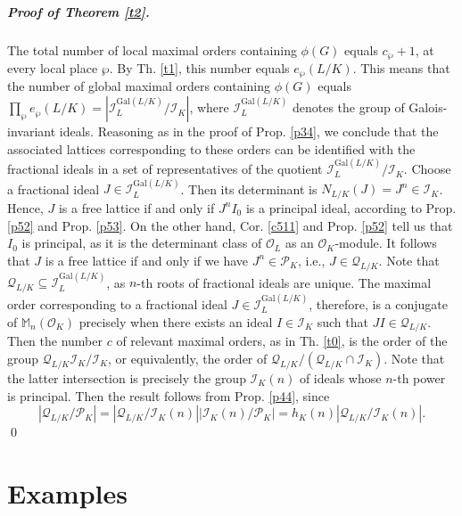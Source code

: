 \documentclass{article}
\theoremstyle{definition}
\begin{document}
\subparagraph{Proof of Theorem \ref{t2}.}
    The total number of local maximal orders containing $\phi(G)$ equals 
    $c_\wp+1$, at every local place $\wp$. By Th. \ref{t1}, 
    this number 
    equals $e_\wp(L/K)$. This means that the number of 
    global maximal orders
    containing $\phi(G)$ equals $\prod_\wp e_\wp(L/K)=
    |\mathcal{I}_L^{\mathrm{Gal}(L/K)}/\mathcal{I}_K|$, where
    $\mathcal{I}_L^{\mathrm{Gal}(L/K)}$ denotes the group of Galois-invariant
    ideals. Reasoning as in the
    proof of Prop. \ref{p34}, we conclude that the associated lattices
    corresponding to these orders can be identified with the 
    fractional ideals
    in a set of representatives of the quotient 
    $\mathcal{I}_L^{\mathrm{Gal}(L/K)}/\mathcal{I}_K$. Choose a fractional
    ideal $J\in\mathcal{I}_L^{\mathrm{Gal}(L/K)}$. Then its determinant is
    $N_{L/K}(J)=J^n\in\mathcal{I}_K$. Hence, $J$ is a 
    free lattice if and only
    if $J^nI_0$ is a principal ideal, according to Prop. 
    \ref{p52} and Prop.
    \ref{p53}. On the other hand, Cor. \ref{c511} 
    and Prop. \ref{p52} tell us 
    that $I_0$ is principal, as it is the determinant class
    of $\mathcal{O}_L$ as an $\mathcal{O}_K$-module. It follows that $J$ is a 
    free lattice if and only if we have $J^n\in\mathcal{P}_K$, 
    i.e., $J\in\mathcal{Q}_{L/K}$. Note
    that $\mathcal{Q}_{L/K}\subseteq\mathcal{I}_L^{\mathrm{Gal}(L/K)}$, as 
    $n$-th roots of fractional ideals are unique. The maximal order
    corresponding to a fractional ideal 
    $J\in\mathcal{I}_L^{\mathrm{Gal}(L/K)}$, therefore, is
    a conjugate of $\mathbb{M}_n(\mathcal{O}_K)$ precisely 
    when there exists an
    ideal $I\in\mathcal{I}_K$ such that $JI\in\mathcal{Q}_{L/K}$.  Then 
    the number $c$ of relevant maximal orders, as in 
    Th. \ref{t0}, is the order
    of the group $\mathcal{Q}_{L/K}\mathcal{I}_K/\mathcal{I}_K$, 
    or equivalently, the order of 
    $\mathcal{Q}_{L/K}/(\mathcal{Q}_{L/K}\cap\mathcal{I}_K)$.
    Note that the latter intersection is precisely the 
    group $\mathcal{I}_K(n)$
    of ideals whose $n$-th power is principal. Then the result follows from
    Prop. \ref{p44}, since
    $$|\mathcal{Q}_{L/K}/\mathcal{P}_K|=
    |\mathcal{Q}_{L/K}/\mathcal{I}_K(n)|
    |\mathcal{I}_K(n)/\mathcal{P}_K|=h_K(n)
    |\mathcal{Q}_{L/K}/\mathcal{I}_K(n)|.$$
    \qed



\section{Examples}\label{secex}
\end{document}

